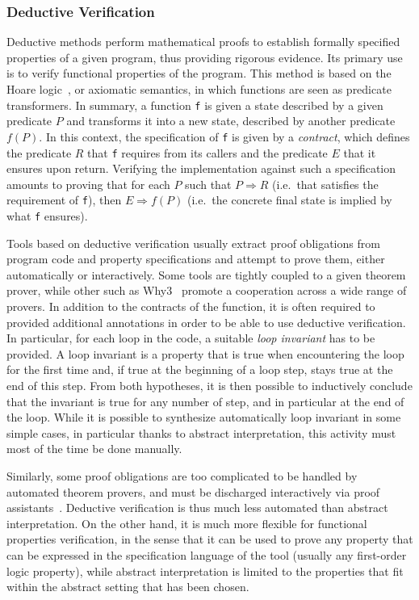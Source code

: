\documentclass{template/openetcs_report}
\begin{document}
\subsubsection{Deductive Verification}
\label{sec:deduct-verif}
Deductive methods
\cite{Beckert.Marche.2010}
\cite{Ledinot.Pariente.2010}\nocite{Beckert.Marche.2010}
perform mathematical proofs to establish formally specified properties
of a given program, thus providing rigorous evidence. Its primary use is to
verify functional properties of the program.
This method is based on the Hoare logic~\cite{Hoare.1969,Hoare.Wirth.1973},
or axiomatic semantics, in
which functions are seen as predicate transformers. In summary, a function
\texttt{f}
is given a state described by a given predicate $P$ and transforms 
it into a new state, described by another predicate $f(P)$.
In this context, the specification of \texttt{f} is given by a \emph{contract}, 
which defines the predicate $R$ that \texttt{f} requires from its callers and
the predicate $E$ that it ensures upon return. Verifying the implementation
against such a specification amounts to proving that for each $P$ such that
$P\Rightarrow R$ (i.e.\ that satisfies the requirement of \texttt{f}), then
$E\Rightarrow f(P)$ 
(i.e.\ the concrete final state is implied by what \texttt{f} ensures).

%
Tools based on deductive verification usually extract proof obligations 
from program code and property specifications and attempt to 
prove them, either automatically or interactively. Some tools are tightly
coupled to a given theorem prover, while other such as Why3~\cite{why3} 
promote a cooperation across a wide range of provers.
%
In addition to the contracts of the function, it is often required to provided
additional annotations in order to be able to use deductive verification. In
particular, for each loop in the code, a suitable \emph{loop invariant} has
to be provided. A loop invariant is a property that is true when encountering
the loop for the first time and, if true at the beginning of a loop step, stays
true at the end of this step. From both hypotheses, it is then possible to
inductively conclude that the invariant is true for any number of step, and in
particular at the end of the loop. While it is possible to synthesize
automatically loop invariant in some simple cases, in particular thanks to
abstract interpretation, this activity must most of the time be done manually.

Similarly, some proof obligations are too complicated to be handled by automated
theorem provers, and must be discharged interactively via proof
assistants~\cite{coq,isabelle}. Deductive verification is thus much less
automated than abstract interpretation. On the other hand, it is much more
flexible for functional properties verification, in the sense that it can be
used to prove any property that can be expressed in the specification language
of the tool (usually any first-order logic property), while abstract
interpretation is limited to the properties that fit within the abstract setting
that has been chosen.
\end{document}
